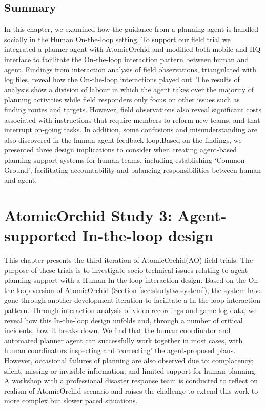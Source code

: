 \section{Summary}

In this chapter, we examined how the guidance from a planning agent is handled socially in the Human On-the-loop setting. To support our field trial we integrated a planner agent with AtomicOrchid and modified both mobile and HQ interface to facilitate the On-the-loop interaction pattern between human and agent. Findings from interaction analysis of field observations, triangulated with log files, reveal how the On-the-loop interactions played out. The results of analysis show a division of labour in which the agent takes over the majority of planning activities while field responders only focus on other issues such as finding routes and targets. However, field observations also reveal significant costs associated with instructions that require members to reform new teams, and that interrupt on-going tasks. In addition, some confusions and misunderstanding are also discovered in the human agent feedback loop.Based on the findings, we presented three design implications to consider when creating agent-based planning support systems for human teams, including establishing `Common Ground', facilitating accountability and balancing responsibilities between human and agent.\\


\chapter{AtomicOrchid Study 3: Agent-supported In-the-loop design}\label{ch:studythree} 
This chapter presents the third iteration of AtomicOrchid(AO) field trials. The purpose of these trials is to investigate socio-technical issues relating to agent planning support with a Human In-the-loop interaction design. Based on the On-the-loop version of AtomicOrchid (Section \ref{sec:studytwosystem}), the system have gone through another development iteration to facilitate a In-the-loop interaction pattern. Through interaction analysis of video recordings and game log data, we reveal how this In-the-loop design unfolds and, through a number of critical incidents, how it breaks down. We find that the human coordinator and automated planner agent can successfully work together in most cases, with human coordinators inspecting and `correcting' the agent-proposed plans. However, occasional failures of planning are also observed due to: complacency; silent, missing or invisible information; and limited support for human planning. A workshop with a professional disaster response team is conducted to reflect on realism of AtomicOrchid scenario and raises the challenge to extend this work to more complex but slower paced situations.   \\


